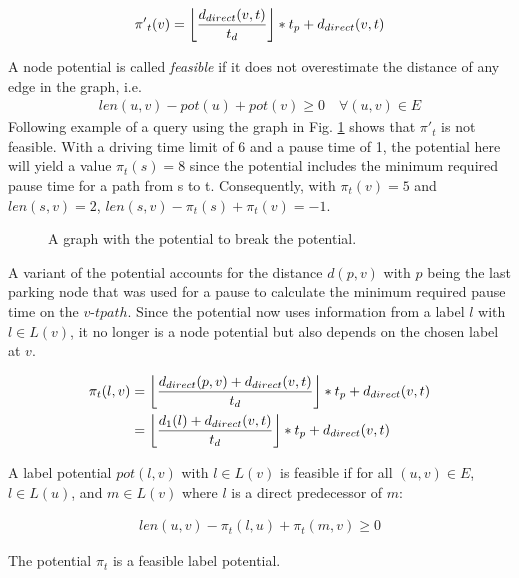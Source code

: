 \[\pi{'}_t(v) = \floor*{ \frac{d_{direct}(v,t)}{t_d} } * t_p + d_{direct}(v,t)\]

A node potential is called \emph{feasible} if it does not overestimate the distance of any edge in the graph, i.e.
\begin{align}
	\label{eq:node_potential_feasibility}
	len(u,v) - pot(u) + pot(v) \ge 0 \quad \forall (u,v) \in E
\end{align}
Following example of a query using the graph in Fig. \ref{fig:graph_infeasible_potential} shows that $\pi{'}_t$ is not feasible. With a driving time limit of 6 and a pause time of 1, the potential here will yield a value $\pi_t(s) = 8$ since the potential includes the minimum required pause time for a path from s to t. Consequently, with $\pi_t(v) = 5$ and $len(s,v) = 2$, $len(s,v) - \pi_t(s) + \pi_t(v) = -1$.

\begin{figure}[hbtp]
	\centering
	
	\caption{A graph with the potential to break the potential.}
	\label{fig:graph_infeasible_potential}
\end{figure}

A variant of the potential accounts for the distance $d(p,v)$ with $p$ being the last parking node that was used for a pause to calculate the minimum required pause time on the $v$-$t path$. Since the potential now uses information from a label $l$ with $l \in L(v)$, it no longer is a node potential but also depends on the chosen label at $v$.

\begin{align*}
	\pi_t(l,v) & = \floor*{ \frac{d_{direct}(p,v) + d_{direct}(v,t)}{t_d} } * t_p + d_{direct}(v,t) \\
	           & = \floor*{ \frac{d_1(l) + d_{direct}(v,t)}{t_d} } * t_p + d_{direct}(v,t)
\end{align*}

\begin{definition}
	\label{def:label_potential_feasibility}
	A label potential $pot(l,v)$ with $l \in L(v)$ is feasible if for all $(u,v) \in E$, $l \in L(u)$, and $m \in L(v)$ where $l$ is a direct predecessor of $m$:

	\begin{align}
		len(u,v) - \pi_t(l,u) + \pi_t(m,v) \ge 0
	\end{align}
\end{definition}

\begin{theorem}
	The potential $\pi_t$ is a feasible label potential.
\end{theorem}

